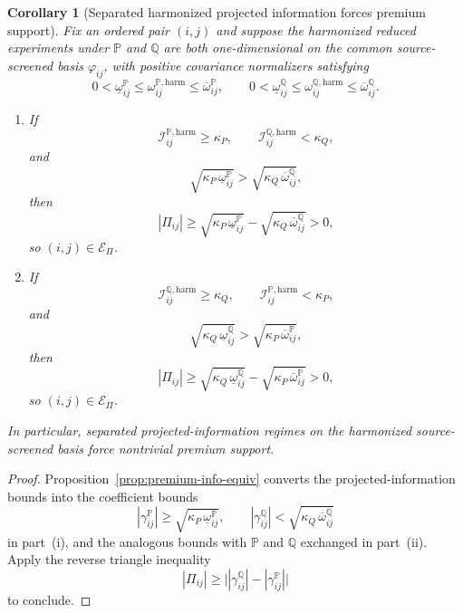 \documentclass[11pt,a4paper]{amsart}
\theoremstyle{plain}
\newtheorem{corollary}[theorem]{Corollary}
\theoremstyle{definition}
\theoremstyle{remark}
\newcommand{\PP}{\mathbb{P}}
\newcommand{\QQ}{\mathbb{Q}}
\newcommand{\cE}{\mathcal{E}}
\begin{document}
\begin{corollary}[Separated harmonized projected information forces premium support]\label{cor:premium-support-info}
Fix an ordered pair \((i,j)\) and suppose the harmonized reduced experiments under \(\PP\) and
\(\QQ\) are both one-dimensional on the common source-screened basis \(\varphi_{ij}\), with
positive covariance normalizers satisfying
\[
        0<\underline\omega_{ij}^\PP\le \omega_{ij}^{\PP,\mathrm{harm}}\le \overline\omega_{ij}^\PP,
        \qquad
        0<\underline\omega_{ij}^\QQ\le \omega_{ij}^{\QQ,\mathrm{harm}}\le \overline\omega_{ij}^\QQ.
\]
\begin{enumerate}[label=(\roman*)]
\item If
\[
        \mathcal I_{ij}^{\PP,\mathrm{harm}}\ge \kappa_P,
        \qquad
        \mathcal I_{ij}^{\QQ,\mathrm{harm}}<\kappa_Q,
\]
and
\[
        \sqrt{\kappa_P\,\underline\omega_{ij}^\PP}
        >
        \sqrt{\kappa_Q\,\overline\omega_{ij}^\QQ},
\]
then
\[
        |\Pi_{ij}|
        \ge
        \sqrt{\kappa_P\,\underline\omega_{ij}^\PP}
        -
        \sqrt{\kappa_Q\,\overline\omega_{ij}^\QQ}
        >0,
\]
so \((i,j)\in\cE_\Pi\).
\item If
\[
        \mathcal I_{ij}^{\QQ,\mathrm{harm}}\ge \kappa_Q,
        \qquad
        \mathcal I_{ij}^{\PP,\mathrm{harm}}<\kappa_P,
\]
and
\[
        \sqrt{\kappa_Q\,\underline\omega_{ij}^\QQ}
        >
        \sqrt{\kappa_P\,\overline\omega_{ij}^\PP},
\]
then
\[
        |\Pi_{ij}|
        \ge
        \sqrt{\kappa_Q\,\underline\omega_{ij}^\QQ}
        -
        \sqrt{\kappa_P\,\overline\omega_{ij}^\PP}
        >0,
\]
so \((i,j)\in\cE_\Pi\).
\end{enumerate}
In particular, separated projected-information regimes on the harmonized source-screened basis force
nontrivial premium support.
\end{corollary}

\begin{proof}
Proposition~\ref{prop:premium-info-equiv} converts the projected-information bounds into the
coefficient bounds
\[
        |\gamma_{ij}^\PP|
        \ge
        \sqrt{\kappa_P\,\underline\omega_{ij}^\PP},
        \qquad
        |\gamma_{ij}^\QQ|
        <
        \sqrt{\kappa_Q\,\overline\omega_{ij}^\QQ}
\]
in part~(i), and the analogous bounds with \(\PP\) and \(\QQ\) exchanged in part~(ii).  Apply the
reverse triangle inequality
\[
        |\Pi_{ij}|
        \ge
        \bigl||\gamma_{ij}^\QQ|-|\gamma_{ij}^\PP|\bigr|
\]
to conclude.
\end{proof}
\end{document}
